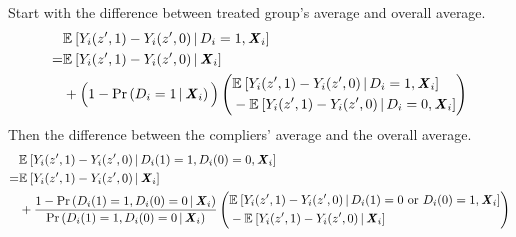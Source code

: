 Start with the difference between treated group's average and overall average.
\begin{align*}
    & \Egiven{Y_i(z', 1) - Y_i(z', 0)}{D_i = 1, \vec X_i} \\
    =& \Egiven{Y_i(z', 1) - Y_i(z', 0)}{\vec X_i} \\
    &+ \Big(1 - \Probgiven{D_i = 1}{\vec X_i} \Big)
    \left( \begin{aligned}
        &\Egiven{Y_i(z', 1) - Y_i(z', 0)}{D_i = 1, \vec X_i} \\ 
        &  - \Egiven{Y_i(z', 1) - Y_i(z', 0)}{D_i = 0, \vec X_i}
    \end{aligned} \right)
\end{align*}
Then the difference between the compliers' average and the overall average.
\begin{align*}
    & \Egiven{ Y_i(z', 1) - Y_i(z', 0)}{D_i(1) = 1, D_i(0) = 0, \vec X_i} \\
    =& \Egiven{Y_i(z', 1) - Y_i(z', 0)}{\vec X_i} \\
    & + \frac{1 - \Probgiven{D_i(1) = 1, D_i(0) = 0}{\vec X_i} }{
        \Probgiven{D_i(1) = 1, D_i(0) = 0}{\vec X_i}}
    \left( \begin{aligned}
        &\Egiven{Y_i(z', 1) - Y_i(z', 0)}{D_i(1) = 0 \text{ or } D_i(0)=1, \vec X_i} \\ 
        &  - \Egiven{Y_i(z', 1) - Y_i(z', 0)}{\vec X_i}
    \end{aligned} \right)
\end{align*}

